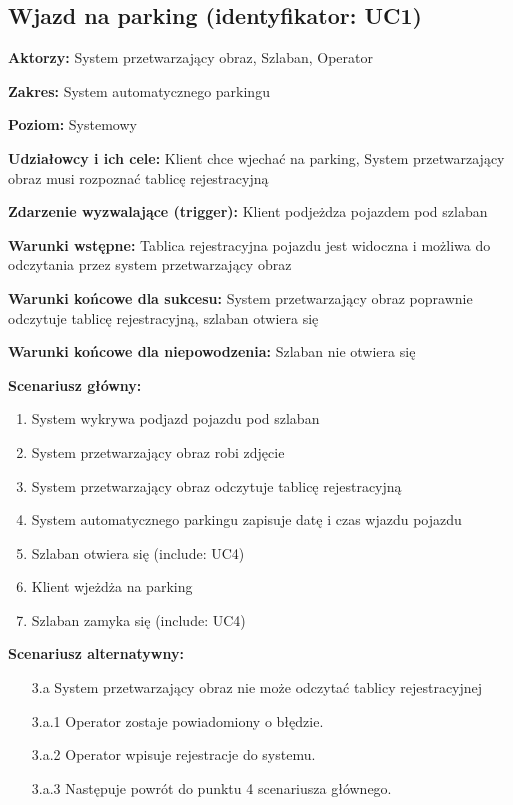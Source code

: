 \subsection{Wjazd na parking (identyfikator: UC1)}
\textbf{Aktorzy: }System przetwarzający obraz, Szlaban, Operator

\hspace{0cm}\textbf{Zakres: } System automatycznego parkingu

\hspace{0cm}\textbf{Poziom: } Systemowy

\hspace{0cm}\textbf{Udziałowcy i ich cele: } Klient chce wjechać na parking, System przetwarzający obraz musi rozpoznać tablicę rejestracyjną

\hspace{0cm}\textbf{Zdarzenie wyzwalające (trigger): } Klient podjeżdza pojazdem pod szlaban

\hspace{0cm}\textbf{Warunki wstępne: } Tablica rejestracyjna pojazdu jest widoczna i możliwa do odczytania przez system przetwarzający obraz

\hspace{0cm}\textbf{Warunki końcowe dla sukcesu: }
System przetwarzający obraz poprawnie odczytuje tablicę rejestracyjną, szlaban otwiera się

\hspace{0cm}\textbf{Warunki końcowe dla niepowodzenia: } Szlaban nie otwiera się \newline

\hspace{0cm}\textbf{Scenariusz główny: }
\begin{enumerate}
\item System wykrywa podjazd pojazdu pod szlaban
\item System przetwarzający obraz robi zdjęcie
\item System przetwarzający obraz odczytuje tablicę rejestracyjną
\item System automatycznego parkingu zapisuje datę i czas wjazdu pojazdu
\item Szlaban otwiera się (include: UC4)
\item Klient wjeżdża na parking
\item Szlaban zamyka się (include: UC4)
\end{enumerate}
\hspace{0cm}\textbf{Scenariusz alternatywny: }
\begin{enumerate}
\item[3.a] System przetwarzający obraz nie może odczytać tablicy rejestracyjnej
\item[3.a.1] Operator zostaje powiadomiony o błędzie.
\item[3.a.2] Operator wpisuje rejestracje do systemu.
\item[3.a.3] Następuje powrót do punktu 4 scenariusza głównego.
\end{enumerate}


